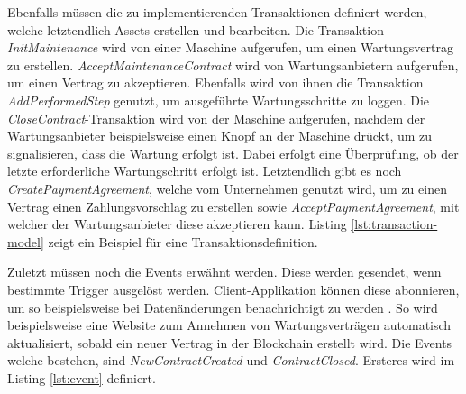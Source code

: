 Ebenfalls müssen die zu implementierenden Transaktionen definiert werden, welche letztendlich Assets erstellen und bearbeiten. Die Transaktion \textit{InitMaintenance} wird von einer Maschine aufgerufen, um einen Wartungsvertrag zu erstellen. \textit{AcceptMaintenanceContract} wird von Wartungsanbietern aufgerufen, um einen Vertrag zu akzeptieren. Ebenfalls wird von ihnen die Transaktion \textit{AddPerformedStep} genutzt, um ausgeführte Wartungsschritte zu loggen. Die \textit{CloseContract}-Transaktion wird von der Maschine aufgerufen, nachdem der Wartungsanbieter beispielsweise einen Knopf an der Maschine drückt, um zu signalisieren, dass die Wartung erfolgt ist. Dabei erfolgt eine Überprüfung, ob der letzte erforderliche Wartungschritt erfolgt ist. Letztendlich gibt es noch \textit{CreatePaymentAgreement}, welche vom Unternehmen genutzt wird, um zu einen Vertrag einen Zahlungsvorschlag zu erstellen sowie \textit{AcceptPaymentAgreement}, mit welcher der Wartungsanbieter diese akzeptieren kann. Listing \ref{lst:transaction-model} zeigt ein Beispiel für eine Transaktionsdefinition.


Zuletzt müssen noch die Events erwähnt werden. Diese werden gesendet, wenn bestimmte Trigger ausgelöst werden. Client-Applikation können diese abonnieren, um so beispielsweise bei Datenänderungen benachrichtigt zu werden \cite{HyperledgerComposerTeamEmittingEventsHyperledger}. So wird beispielsweise eine Website zum Annehmen von Wartungsverträgen automatisch aktualisiert, sobald ein neuer Vertrag in der Blockchain erstellt wird. Die Events welche bestehen, sind \textit{NewContractCreated} und \textit{ContractClosed}. Ersteres wird im Listing \ref{lst:event} definiert. 



